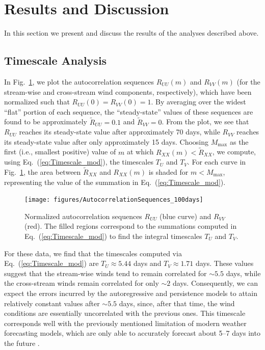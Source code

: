 \documentclass[11pt, oneside]{article}
\newcommand{\figref}[1]{Fig.~\ref{#1}}
\newcommand{\eqnref}[1]{Eq.~(\ref{#1})}
\begin{document}
\section{Results and Discussion}\label{sec:Results}
In this section we present and discuss the results of the analyses described above.

\subsection{Timescale Analysis}\label{sec:Results:Timescale}
In \figref{fig:Autocorrelations}, we plot the autocorrelation sequences $R_{UU}(m)$ and $R_{VV}(m)$ (for the stream-wise and cross-stream wind components, respectively), which have been normalized such that $R_{UU}(0) = R_{VV}(0) = 1$.
By averaging over the widest ``flat'' portion of each sequence, the ``steady-state'' values of these sequences are found to be approximately $\tilde{R}_{UU} = 0.1$ and $\tilde{R}_{VV} = 0$.
From the plot, we see that $R_{UU}$ reaches its steady-state value after approximately 70 days,
while $R_{VV}$ reaches its steady-state value after only approximately 15 days.
Choosing $M_\text{max}$ as the first (i.e., smallest positive) value of $m$ at which $R_{XX}(m) < \tilde{R}_{XX}$, we compute, using \eqnref{eq:Timescale_mod}, the timescales $T_U$ and $T_V$.
For each curve in \figref{fig:Autocorrelations}, the area between $\tilde{R}_{XX}$ and $R_{XX}(m)$ is shaded for $m < M_\text{max}$, representing the value of the summation in \eqnref{eq:Timescale_mod}.

\begin{figure}[htb]
\centering
\texttt{[image: figures/AutocorrelationSequences\_100days]}
\caption{Normalized autocorrelation sequences $R_{UU}$ (blue curve) and $R_{VV}$ (red).
The filled regions correspond to the summations computed in \eqnref{eq:Timescale_mod} to find the integral timescales $T_U$ and $T_V$.}
\label{fig:Autocorrelations}
\end{figure}

For these data, we find that the timescales computed via \eqnref{eq:Timescale_mod} are $T_U \approx 5.44$ days and $T_V \approx 1.71$ days.
These values suggest that the stream-wise winds tend to remain correlated for $\sim 5.5$ days, while the cross-stream winds remain correlated for only $\sim 2$ days.
Consequently, we can expect the errors incurred by the autoregressive and persistence models to attain relatively constant values after $\sim 5.5$ days, since, after that time, the wind conditions are essentially uncorrelated with the previous ones.
This timescale corresponds well with the previously mentioned limitation of modern weather forecasting models, which are only able to accurately forecast about 5--7 days into the future \citep[Sec.~1.2]{Giebel2011}.
\end{document}
